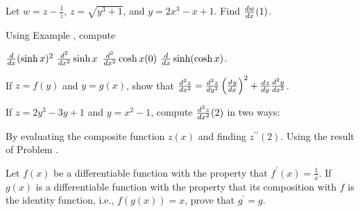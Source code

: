 \begin{exercises}
Let $w = z - \frac1z$, $z= \sqrt{y^3+1}$, and
$y = 2x^3 - x + 1$.  Find $\frac{d w}{d x} (1)$.

Using Example , compute
\begin{exenum}
\sx
$\frac{d}{dx} (\sinh x)^2$
\sx
$\frac{d^{2}{}}{dx^{2}} \sinh x$
\sx
$\frac{d^{2}{}}{dx^{2}} \cosh x (0)$
\sx
$\frac{d}{dx} \sinh(\cosh x)$.
\end{exenum}

If $z = f(y)$ and $y = g(x)$, show that
$\frac{d^{2}{z}}{dx^{2}} = \frac{d^{2}{z}}{d{y}^{2}} \left( \frac{d^{}{y}}{dx^{}} \right)^2 +
\frac{d^{}{z}}{d{y}^{}} \frac{d^{2}{y}}{dx^{2}}$.

If $z = 2y^3 - 3y + 1$ and $y = x^2 - 1$, compute
$\frac{d^{2}{z}}{dx^{2}} (2)$ in two ways:
\begin{exenum}
\sx
By evaluating the composite function $z(x)$ and finding
$z^{\prime\prime} (2)$.
\sx
Using the result of Problem .
\end{exenum}

Let $f(x)$ be a differentiable function with the property that
$f^\prime (x) = \frac1x$.  If $g(x)$ is a differentiable function
with the property that its composition with $f$ is the identity
function, i.e., $f(g(x)) = x$, prove that $g^\prime = g$.

\end{exercises}
